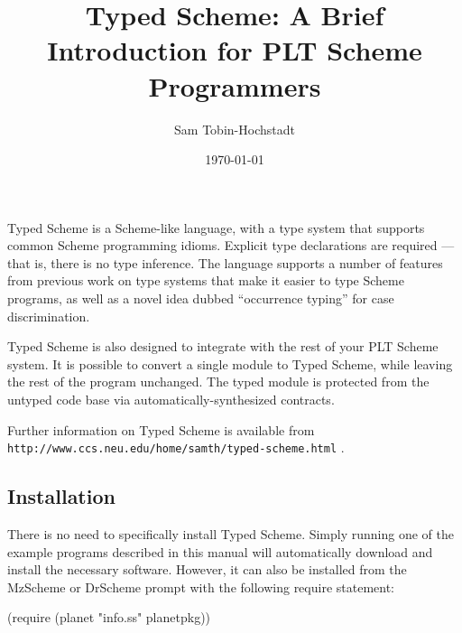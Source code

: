 \documentclass{book}
\author{Sam Tobin-Hochstadt}
\title{Typed Scheme: A Brief Introduction for PLT Scheme Programmers}
\date{\today}
\begin{document}
 
\maketitle
{}

\newcommand{\tlang}{\scheme|tlang|}

\begin{schemeregion}





Typed Scheme is a Scheme-like language, with a type system that
supports common Scheme programming idioms.  Explicit type declarations
are required --- that is, there is no type inference.  The language
supports a number of features from previous work on type systems that
make it easier to type Scheme programs, as well as a novel idea dubbed
``occurrence typing'' for case discrimination.

Typed Scheme is also designed to integrate with the rest of your PLT
Scheme system.  It is possible to convert a single module to Typed
Scheme, while leaving the rest of the program unchanged.  The typed
module is protected from the untyped code base via
automatically-synthesized contracts.

Further information on Typed Scheme is available from
{\tt http://www.ccs.neu.edu/home/samth/typed-scheme.html} .

\subsection*{Installation}

There is no need to specifically install Typed Scheme.  Simply running
one of the example programs described in this manual will
automatically download and install the necessary software.  However,
it can also be installed from the MzScheme or DrScheme prompt with the
following require statement:

\begin{schemedisplay}
(require (planet "info.ss" planetpkg))
\end{schemedisplay}


\end{schemeregion}
\end{document}
